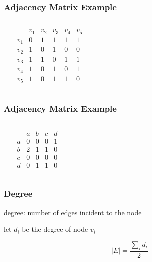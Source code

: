 \documentclass[dvipsnames]{beamer}
\begin{document}
\begin{frame}
  \frametitle{Adjacency Matrix Example}

  \begin{example}
    \begin{columns}
      \begin{center}
      \end{center}

      \[
        \begin{array}{c|ccccc}
                & v_1 & v_2 & v_3 & v_4 & v_5\\\hline
            v_1 & 0 & 1 & 1 & 1 & 1\\
            v_2 & 1 & 0 & 1 & 0 & 0\\
            v_3 & 1 & 1 & 0 & 1 & 1\\
            v_4 & 1 & 0 & 1 & 0 & 1\\
            v_5 & 1 & 0 & 1 & 1 & 0
        \end{array}
      \]
    \end{columns}
  \end{example}
\end{frame}

\begin{frame}
  \frametitle{Adjacency Matrix Example}

  \begin{example}
    \begin{columns}
    \begin{center}
    \end{center}

      \[
        \begin{array}{c|cccc}
              & a & b & c & d\\\hline
            a & 0 & 0 & 0 & 1\\
            b & 2 & 1 & 1 & 0\\
            c & 0 & 0 & 0 & 0\\
            d & 0 & 1 & 1 & 0
        \end{array}
      \]
    \end{columns}
  \end{example}
\end{frame}

\begin{frame}
  \frametitle{Degree}

  \begin{definition}
    \alert{degree}: number of edges incident to the node
  \end{definition}

  \pause
  \begin{theorem}
    let $d_i$ be the degree of node $v_i$

    \[ |E| = \frac{\sum_i d_i}{2} \]
  \end{theorem}
\end{frame}
\end{document}
